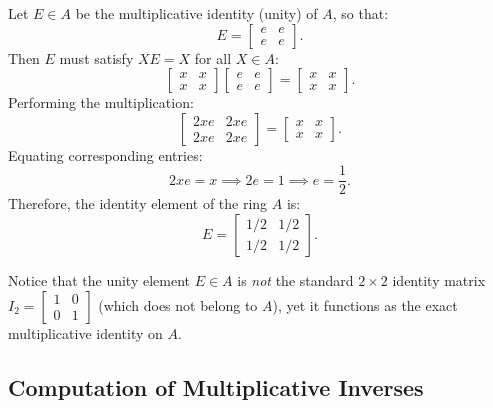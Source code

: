 Let $E \in A$ be the multiplicative identity (unity) of $A$, so that:
\[
E = \begin{bmatrix} e & e \\ e & e \end{bmatrix}.
\]
Then $E$ must satisfy $X E = X$ for all $X \in A$:
\[
\begin{bmatrix} x & x \\ x & x \end{bmatrix} \begin{bmatrix} e & e \\ e & e \end{bmatrix} = \begin{bmatrix} x & x \\ x & x \end{bmatrix}.
\]
Performing the multiplication:
\[
\begin{bmatrix} 2xe & 2xe \\ 2xe & 2xe \end{bmatrix} = \begin{bmatrix} x & x \\ x & x \end{bmatrix}.
\]
Equating corresponding entries:
\[
2xe = x \implies 2e = 1 \implies e = \frac{1}{2}.
\]
Therefore, the identity element of the ring $A$ is:
\[
E = \begin{bmatrix} 1/2 & 1/2 \\ 1/2 & 1/2 \end{bmatrix}.
\]
\begin{remark}
Notice that the unity element $E \in A$ is \emph{not} the standard $2 \times 2$ identity matrix $I_2 = \begin{bmatrix} 1 & 0 \\ 0 & 1 \end{bmatrix}$ (which does not belong to $A$), yet it functions as the exact multiplicative identity on $A$.
\end{remark}

\subsection{Computation of Multiplicative Inverses}

